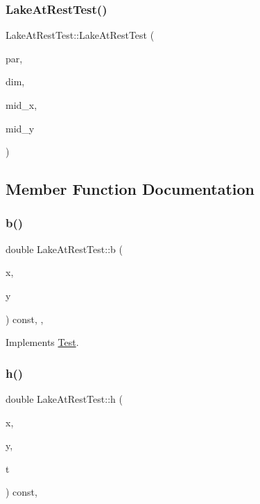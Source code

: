 \subsubsection{\texorpdfstring{Lake\+At\+Rest\+Test()}{LakeAtRestTest()}}
{\footnotesize\ttfamily Lake\+At\+Rest\+Test\+::\+Lake\+At\+Rest\+Test (\begin{DoxyParamCaption}\item[{const \hyperlink{structParser}{Parser} \&}]{par,  }\item[{const \hyperlink{structDimensionManager}{Dimension\+Manager} \&}]{dim,  }\item[{double}]{mid\+\_\+x,  }\item[{double}]{mid\+\_\+y }\end{DoxyParamCaption})\hspace{0.3cm}{\ttfamily [inline]}}



\subsection{Member Function Documentation}
\mbox{\label{classLakeAtRestTest_a15491ec847ab6b11c9d15ac670ebf350}} 
\subsubsection{\texorpdfstring{b()}{b()}}
{\footnotesize\ttfamily double Lake\+At\+Rest\+Test\+::b (\begin{DoxyParamCaption}\item[{double}]{x,  }\item[{double}]{y }\end{DoxyParamCaption}) const\hspace{0.3cm}{\ttfamily [inline]}, {\ttfamily [override]}, {\ttfamily [virtual]}}



Implements \hyperlink{classTest_a7bddd128de5558db4bae9a7542c8ae81}{Test}.

\mbox{\label{classLakeAtRestTest_acba50afd11751c9557b639e84e895f41}} 
\subsubsection{\texorpdfstring{h()}{h()}}
{\footnotesize\ttfamily double Lake\+At\+Rest\+Test\+::h (\begin{DoxyParamCaption}\item[{double}]{x,  }\item[{double}]{y,  }\item[{double}]{t }\end{DoxyParamCaption}) const\hspace{0.3cm}{\ttfamily [inline]}, {\ttfamily [virtual]}}



